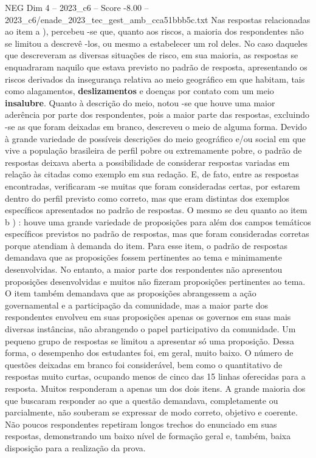 \begin{textsample}{NEG Dim 4 – 2023\_c6 – Score -8.00 – 2023\_c6/enade\_2023\_tec\_gest\_amb\_cca51bbb5c.txt}
Nas respostas relacionadas ao item a ), percebeu -se que, quanto aos riscos, a maioria dos respondentes não se limitou a descrevê -los, ou mesmo a estabelecer um rol deles.
No caso daqueles que descreveram as diversas situações de risco, em sua maioria, as respostas se enquadraram naquilo que estava previsto no padrão de resposta, apresentando os riscos derivados da insegurança relativa ao meio geográfico em que habitam, tais como alagamentos, \textbf{deslizamentos} e doenças por contato com um meio \textbf{insalubre}.
Quanto à descrição do meio, notou -se que houve uma maior aderência por parte dos respondentes, pois a maior parte das respostas, excluindo -se as que foram deixadas em branco, descreveu o meio de alguma forma.
Devido à grande variedade de possíveis descrições do meio geográfico e/ou social em que vive a população brasileira de perfil pobre ou extremamente pobre, o padrão de respostas deixava aberta a possibilidade de considerar respostas variadas em relação às citadas como exemplo em sua redação.
E, de fato, entre as respostas encontradas, verificaram -se muitas que foram consideradas certas, por estarem dentro do perfil previsto como correto, mas que eram distintas dos exemplos específicos apresentados no padrão de respostas.
O mesmo se deu quanto ao item b ) : houve uma grande variedade de proposições para além dos campos temáticos específicos previstos no padrão de respostas, mas que foram consideradas corretas porque atendiam à demanda do item.
Para esse item, o padrão de respostas demandava que as proposições fossem pertinentes ao tema e minimamente desenvolvidas.
No entanto, a maior parte dos respondentes não apresentou proposições desenvolvidas e muitos não fizeram proposições pertinentes ao tema.
O item também demandava que as proposições abrangessem a ação governamental e a participação da comunidade, mas a maior parte dos respondentes envolveu em suas proposições apenas os governos em suas mais diversas instâncias, não abrangendo o papel participativo da comunidade.
Um pequeno grupo de respostas se limitou a apresentar só uma proposição.
Dessa forma, o desempenho dos estudantes foi, em geral, muito baixo.
O número de questões deixadas em branco foi considerável, bem como o quantitativo de respostas muito curtas, ocupando menos de cinco das 15 linhas oferecidas para a resposta.
Muitos responderam a apenas um dos dois itens.
A grande maioria dos que buscaram responder ao que a questão demandava, completamente ou parcialmente, não souberam se expressar de modo correto, objetivo e coerente.
Não poucos respondentes repetiram longos trechos do enunciado em suas respostas, demonstrando um baixo nível de formação geral e, também, baixa disposição para a realização da prova.

\end{textsample}
